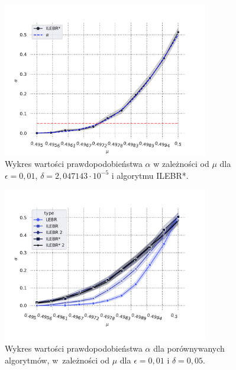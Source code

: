 \documentclass[inzynierska]{pwr_wmat_praca_dyplomowa}
\theoremstyle{plain}
\numberwithin{theorem}{chapter}
\theoremstyle{definition}
\numberwithin{theorem}{chapter}
\begin{document}
	\begin{figure}
		\centering
		\includegraphics[width=0.8\textwidth]{imagens/test_powrs_alpha_0_05.pdf}
		\caption{Wykres wartości prawdopodobieństwa $\alpha$ w zależności od $\mu$ dla $\epsilon =0,01$, $\delta =2,047143\cdot10^{-5}$ i algorytmu ILEBR*.}
		\label{fig:test_powrs_alpha_0_05}
	\end{figure}
	\begin{figure}
		\centering
		\includegraphics[width=0.8\textwidth]{imagens/test_powrs.pdf}
		\caption{Wykres wartości prawdopodobieństwa $\alpha$ dla porównywanych algorytmów, w~zależności od $\mu$ dla $\epsilon = 0,01$ i $\delta = 0,05$.}
		\label{fig:test_powrs}
	\end{figure}
\end{document}
